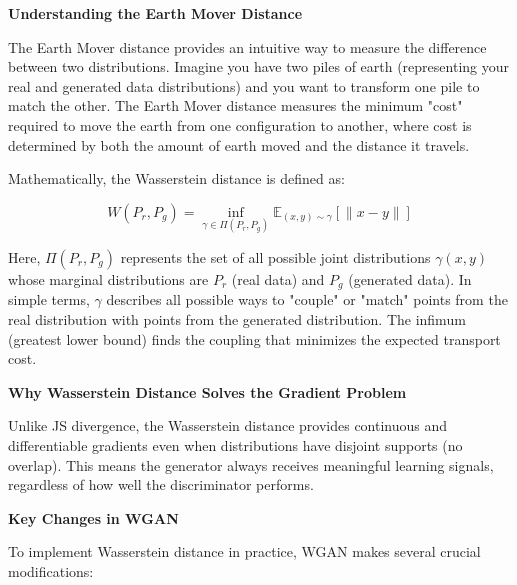 \textbf{Understanding the Earth Mover Distance}

The Earth Mover distance provides an intuitive way to measure the difference between two distributions. Imagine you have two piles of earth (representing your real and generated data distributions) and you want to transform one pile to match the other. The Earth Mover distance measures the minimum "cost" required to move the earth from one configuration to another, where cost is determined by both the amount of earth moved and the distance it travels.

Mathematically, the Wasserstein distance is defined as:

\begin{equation}
W(P_r, P_g) = \inf_{\gamma \in \Pi(P_r, P_g)} \mathbb{E}_{(x,y) \sim \gamma}[\|x - y\|]
\end{equation}

Here, $\Pi(P_r, P_g)$ represents the set of all possible joint distributions $\gamma(x,y)$ whose marginal distributions are $P_r$ (real data) and $P_g$ (generated data). In simple terms, $\gamma$ describes all possible ways to "couple" or "match" points from the real distribution with points from the generated distribution. The infimum (greatest lower bound) finds the coupling that minimizes the expected transport cost.

\textbf{Why Wasserstein Distance Solves the Gradient Problem}

Unlike JS divergence, the Wasserstein distance provides continuous and differentiable gradients even when distributions have disjoint supports (no overlap). This means the generator always receives meaningful learning signals, regardless of how well the discriminator performs.

\textbf{Key Changes in WGAN}

To implement Wasserstein distance in practice, WGAN makes several crucial modifications:

